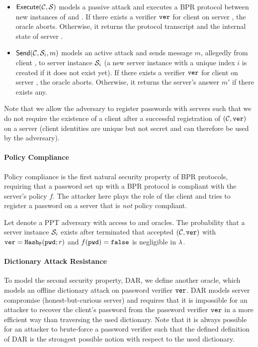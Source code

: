 \begin{itemize}
  \item $\mathsf{Execute}(\mathcal{C},\mathcal{S})$ models a passive attack and executes a \ac{BPR} protocol between new instances of \Client and \Server.
        If there exists a verifier $\mathtt{ver}$ for client \Client on server \Server, the oracle aborts.
        Otherwise, it returns the protocol transcript and the internal state of server \Server.
  \item $\mathsf{Send}(\mathcal{C},\mathcal{S}_i,m)$ models an active attack and sends message $m$, allegedly from client \Client, to server instance $\mathcal{S}_i$ (a new server instance with a unique index $i$ is created if it does not exist yet).
        If there exists a verifier $\mathtt{ver}$ for client \Client on server \Server, the oracle aborts.
        Otherwise, it returns the server's answer $m'$ if there exists any.
\end{itemize}

\noindent
Note that we allow the adversary to register passwords with servers such that we do not require the existence of a client \Client after a successful registration of $(\mathcal{C},\mathtt{ver})$ on a server (client identities \Client are unique but not secret and can therefore be used by the adversary).

\paragraph{Policy Compliance}
Policy compliance is the first natural security property of \ac{BPR} protocols, requiring that a password set up with a \ac{BPR} protocol is compliant with the server's policy $f$.
The attacker here plays the role of the client and tries to register a password \pwd on a server that is \emph{not} policy compliant.

\begin{definition}\label{def:pc}
Let \cA denote a \ac{PPT} adversary with access to \Execute and \Send oracles.
The probability that a server instance $\mathcal{S}_i$ exists after \cA terminated that accepted $(\mathcal{C},\mathtt{ver})$ with $\mathtt{ver}=\mathtt{Hash_P}(\mathtt{pwd};r)$ and $f(\mathtt{pwd})=\mathtt{false}$ is negligible in $\lambda$.
\eod
\end{definition}

\paragraph{Dictionary Attack Resistance}
To model the second security property, \acl{DAR}, we define another oracle, which models an offline dictionary attack on password verifier $\mathtt{ver}$.
\ac{DAR} models server compromise (honest-but-curious server) and requires that it is impossible for an attacker to recover the client's password from the password verifier $\mathtt{ver}$ in a more efficient way than traversing the used dictionary.
Note that it is always possible for an attacker to brute-force a password verifier such that the defined definition of \ac{DAR} is the strongest possible notion with respect to the used dictionary.

